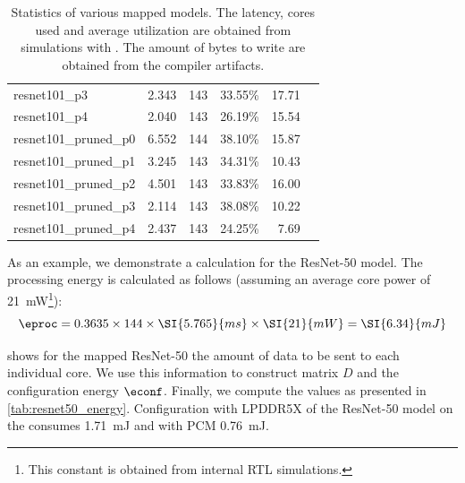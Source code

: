 \begin{table}[hbtp]
\begin{tabular}{@{}lrrrrr@{}}
resnet101\_p3           & 2.343                                                           & 143            & 33.55\%            & 17.71                                                             \\
resnet101\_p4           & 2.040                                                           & 143            & 26.19\%            & 15.54                                                             \\
resnet101\_pruned\_p0   & 6.552                                                           & 144            & 38.10\%            & 15.87                                                             \\
resnet101\_pruned\_p1   & 3.245                                                           & 143            & 34.31\%            & 10.43                                                             \\
resnet101\_pruned\_p2   & 4.501                                                           & 143            & 33.83\%            & 16.00                                                             \\
resnet101\_pruned\_p3   & 2.114                                                           & 143            & 38.08\%            & 10.22                                                             \\
resnet101\_pruned\_p4   & 2.437                                                           & 143            & 24.25\%            & 7.69                                                              \\
\bottomrule
\end{tabular}
\caption{
    Statistics of various mapped models.
    The latency, cores used and average utilization are obtained from simulations with \graipefruit{}.
    The amount of bytes to write are obtained from the compiler artifacts.
}
\label{tab:example_models_stats}
\end{table}

As an example, we demonstrate a calculation for the ResNet-50 model.
The processing energy is calculated as follows (assuming an average core power of \SI{21}{mW}\footnote{This constant is obtained from internal RTL simulations.}):
\begin{equation}
    \eproc = 0.3635 \times 144 \times \SI{5.765}{ms} \times \SI{21}{mW} = \SI{6.34}{mJ}
\end{equation}

 shows for the mapped ResNet-50 the amount of data to be sent to each individual core.
We use this information to construct matrix $D$ and the configuration energy $\econf$.
Finally, we compute the values as presented in \cref{tab:resnet50_energy}.
Configuration with LPDDR5X of the ResNet-50 model on the \graicore{} consumes \SI{1.71}{mJ} and with PCM \SI{0.76}{mJ}.

